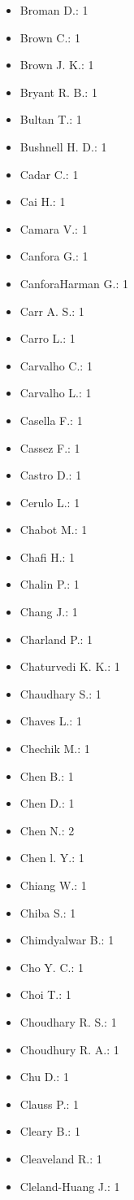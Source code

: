 \begin{itemize}
\item Broman D.: 1
\item Brown C.: 1
\item Brown J. K.: 1
\item Bryant R. B.: 1
\item Bultan T.: 1
\item Bushnell H. D.: 1
\item Cadar C.: 1
\item Cai H.: 1
\item Camara V.: 1
\item Canfora G.: 1
\item CanforaHarman G.: 1
\item Carr A. S.: 1
\item Carro L.: 1
\item Carvalho C.: 1
\item Carvalho L.: 1
\item Casella F.: 1
\item Cassez F.: 1
\item Castro D.: 1
\item Cerulo L.: 1
\item Chabot M.: 1
\item Chafi H.: 1
\item Chalin P.: 1
\item Chang J.: 1
\item Charland P.: 1
\item Chaturvedi K. K.: 1
\item Chaudhary S.: 1
\item Chaves L.: 1
\item Chechik M.: 1
\item Chen B.: 1
\item Chen D.: 1
\item Chen N.: 2
\item Chen l. Y.: 1
\item Chiang W.: 1
\item Chiba S.: 1
\item Chimdyalwar B.: 1
\item Cho Y. C.: 1
\item Choi T.: 1
\item Choudhary R. S.: 1
\item Choudhury R. A.: 1
\item Chu D.: 1
\item Clauss P.: 1
\item Cleary B.: 1
\item Cleaveland R.: 1
\item Cleland-Huang J.: 1

\end{itemize}
